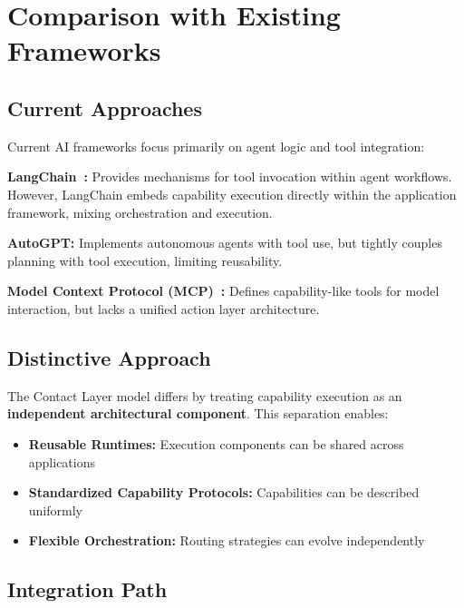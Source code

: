 \section{Comparison with Existing Frameworks}

\subsection{Current Approaches}

Current AI frameworks focus primarily on agent logic and tool integration:

\textbf{LangChain~\cite{brooks1991}:} Provides mechanisms for tool invocation within agent workflows. However, LangChain embeds capability execution directly within the application framework, mixing orchestration and execution.

\textbf{AutoGPT:} Implements autonomous agents with tool use, but tightly couples planning with tool execution, limiting reusability.

\textbf{Model Context Protocol (MCP)~\cite{openai2023}:} Defines capability-like tools for model interaction, but lacks a unified action layer architecture.

\subsection{Distinctive Approach}

The Contact Layer model differs by treating capability execution as an \textbf{independent architectural component}. This separation enables:
\begin{itemize}[leftmargin=*]
\item \textbf{Reusable Runtimes:} Execution components can be shared across applications
\item \textbf{Standardized Capability Protocols:} Capabilities can be described uniformly
\item \textbf{Flexible Orchestration:} Routing strategies can evolve independently
\end{itemize}

\subsection{Integration Path}

